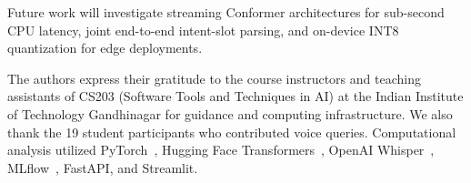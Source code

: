 \documentclass[sigconf,authordraft]{acmart}
\begin{document}
Future work will investigate streaming Conformer architectures for sub-second CPU latency,
joint end-to-end intent-slot parsing, and on-device INT8 quantization for edge deployments.

\begin{acks}
The authors express their gratitude to the course instructors and teaching assistants of CS203
(Software Tools and Techniques in AI) at the Indian Institute of Technology Gandhinagar for guidance
and computing infrastructure. We also thank the 19 student participants who contributed voice queries.
Computational analysis utilized PyTorch~\cite{paszke2019pytorch}, Hugging Face Transformers~\cite{wolf2020transformers},
OpenAI Whisper~\cite{radford2023robust}, MLflow~\cite{zaharia2018mlflow}, FastAPI, and Streamlit.
\end{acks}
\end{document}
